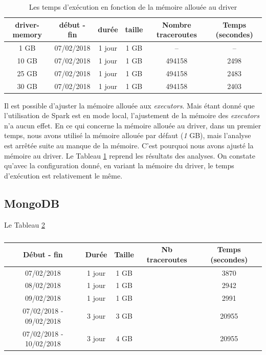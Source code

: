 \begin{table}[H]
	\begin{tabular}{cccccc}
	 \textbf{driver-memory}&	\textbf{début - fin} &\textbf{durée}  & \textbf{taille}  & \textbf{Nombre traceroutes} & \textbf{Temps (secondes)}  \\ \hline
			1 GB&	07/02/2018&1 jour&1 GB& --& -- \\ \hline 
	10 GB&	07/02/2018&1 jour&1 GB&494158& 2498 %
	 \\ \hline 
	25 GB&	07/02/2018&1 jour&1 GB&   494158   & 2483 %
	\\ \hline
	

	30 GB&	07/02/2018&1 jour&1 GB&   494158   & 2403 
	\\ \hline
	
	
	\end{tabular}
	\caption{Les temps d'exécution en fonction de la mémoire allouée au driver }
	\label{tab:spark-timing-driver}
\end{table}


Il est possible d'ajuster la mémoire allouée aux \textit{executors}. Mais étant donné que l'utilisation de Spark est en mode local, l'ajustement de la mémoire des \textit{executors} n'a aucun effet. En ce qui concerne la mémoire allouée au driver, dans un premier temps,  nous avons utilisé la mémoire allouée par défaut (\textit{1} GB), mais l'analyse est arrêtée suite au manque de la mémoire.  C'est pourquoi nous avons ajusté la mémoire au driver. Le Tableau 
\ref{tab:spark-timing-driver} reprend les résultats des analyses. On constate qu'avec la configuration donné, en variant  la mémoire du driver, le temps d'exécution est relativement le même. 

\subsection{MongoDB}

Le Tableau \ref{tab:mongotiming-timing}

\begin{table}[H]
	\begin{tabular}{ccccc}
		\textbf{Début - fin} &\textbf{Durée}  & \textbf{Taille}  & \textbf{Nb traceroutes} & \textbf{Temps (secondes)} \\ \hline
		
		07/02/2018&1 jour&1 GB&& 3870\\ \hline
		08/02/2018&1 jour&1 GB&& 2942\\ \hline
		09/02/2018&1 jour& 1 GB&& 2991\\ \hline
		07/02/2018 - 09/02/2018&3 jour& 3 GB&& 20955\\ \hline
		07/02/2018 - 10/02/2018&3 jour& 4 GB&& 20955\\ \hline
	\end{tabular}
	\caption{}
	\label{tab:mongotiming-timing}
\end{table}

